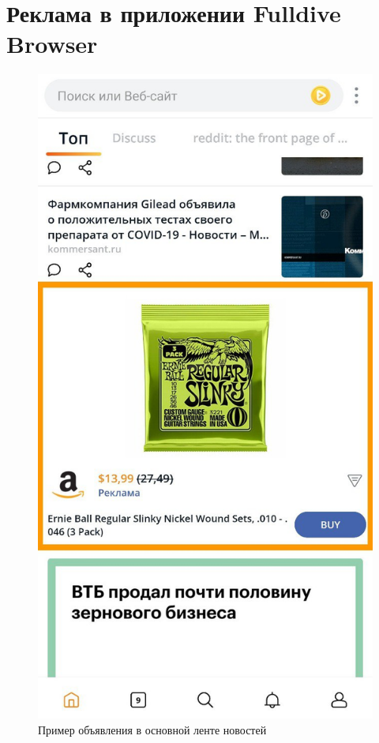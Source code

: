 \documentclass[specification,annotation,times]{itmo-student-thesis}
\begin{document}

\appendix

\chapter{Реклама в приложении Fulldive Browser}\label{sec:app:screenshots}

\begin{figure}[h]
\caption{Пример объявления в основной ленте новостей}
\includegraphics[height=0.28\paperheight]{ad-in-feed1}
\centering
\end{figure}
\end{document}
